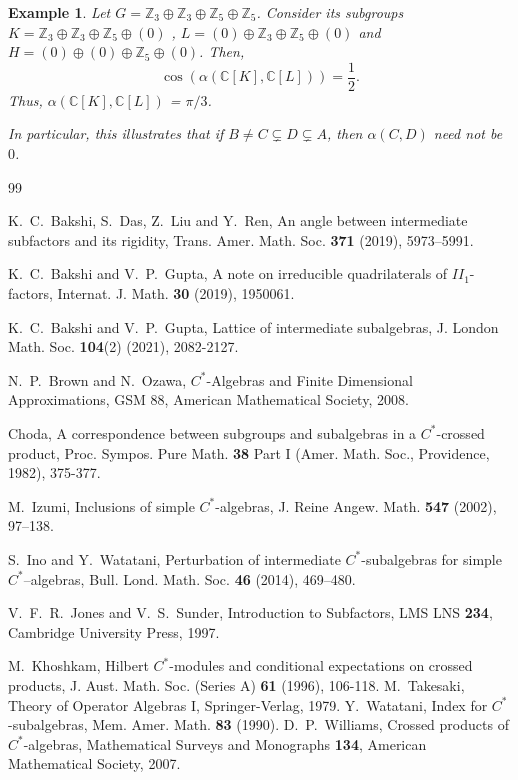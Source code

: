 \documentclass[a4]{amsart}
\newtheorem{example}[theorem]{\bf Example}
\numberwithin{equation}{section}
\newcommand{\C}{\mathbb{C}}
\newcommand{\Z}{\mathbb{Z}}
\begin{document}
\begin{example} \label{example-gps}
   Let $G= \Z_3 \oplus \Z_3 \oplus \Z_5 \oplus \Z_5 $. Consider its 
    subgroups $ K= \Z_3 \oplus \Z_3 \oplus \Z_5 \oplus (0)$ , $ L= (0)
    \oplus \Z_3 \oplus \Z_5 \oplus (0)$ and $ H= (0) \oplus (0)\oplus
    \Z_5 \oplus (0)$. Then, 
  \[
  \cos\left( \alpha (\C[K],\C[L])\right) = \frac{1}{2}.
  \] 
  Thus,  $\alpha(\C[K], \C[L])$ = $ \pi/3$.

  In particular, this illustrates that if $B
  \neq C \subsetneq D \subsetneq A$, then $\alpha (C,D)$ need not be
  $0$.
  \end{example}
\begin{thebibliography}{99}

 K.~C.~Bakshi, S.~Das, Z.~Liu and Y.~Ren, An angle between intermediate subfactors and its rigidity,
Trans. Amer. Math. Soc. {\bf 371} (2019), 5973–5991.


 K.~C.~Bakshi and V.~P.~Gupta, A note on irreducible quadrilaterals of $II_1$-factors, Internat. J. Math.
{\bf 30} (2019), 1950061.

 K.~C.~Bakshi and V.~P.~Gupta, Lattice of intermediate
  subalgebras, J. London Math. Soc. {\bf 104}(2) (2021), 2082-2127.

   N.~P.~Brown and N.~Ozawa, $C^*$-Algebras and Finite Dimensional Approximations, GSM 88, American Mathematical Society, 2008.


 Choda, A correspondence between subgroups and
  subalgebras in a $C^*$-crossed product, Proc. Sympos. Pure
  Math. {\bf 38} Part I (Amer. Math. Soc., Providence, 1982), 375-377.

 M.~Izumi, Inclusions of simple $C^*$-algebras, J. Reine Angew. Math. {\bf 547} (2002), 97–138.

 S.~Ino and Y.~Watatani, Perturbation of intermediate $C^*$-subalgebras for simple $C^*$--algebras, Bull.
Lond. Math. Soc. {\bf 46} (2014), 469–480.


 V.~F.~R.~Jones and V.~S.~Sunder, Introduction to
  Subfactors, LMS LNS {\bf 234}, Cambridge University Press, 1997.
  
 M.~Khoshkam, Hilbert $C^*$-modules and conditional
  expectations on crossed products, J. Aust. Math. Soc. (Series A)
  {\bf 61} (1996), 106-118.
 M.~Takesaki, Theory of Operator Algebras I,
  Springer-Verlag, 1979.
 Y.~Watatani, Index for $C^*$-subalgebras, Mem. Amer. Math. {\bf 83} (1990).
 D.~P.~Williams, Crossed products of $C^*$-algebras,
  Mathematical Surveys and Monographs {\bf 134}, American
  Mathematical Society, 2007.
\end{thebibliography}
\end{document}
